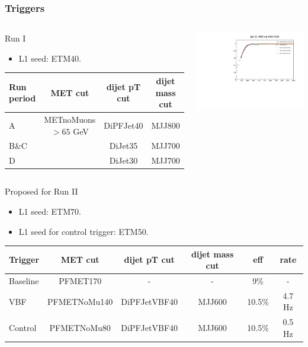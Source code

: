 \documentclass[red,compress,xcolor=table]{beamer}
\begin{document}
\begin{frame}
\begin{columns}
\end{columns}

\end{frame}

\begin{frame}
\frametitle{Triggers}

\begin{columns}
\begin{block}{\scriptsize Run I}
\begin{itemize}
\item \scriptsize L1 seed: ETM40.
\end{itemize}
{\tiny
\begin{tabular}{|l|c|c|c|}
\hline
Run period & MET cut & dijet pT cut & dijet mass cut \\
\hline
A & METnoMuons$>65$ GeV & DiPFJet40 & MJJ800 \\
B\&C &  & DiJet35 & MJJ700 \\
D &  & DiJet30 & MJJ700 \\
\hline
\end{tabular}
}
\end{block}
\includegraphics[width=1.0\textwidth]{./hData_MET_1D_45D.pdf}
\end{columns}

\begin{center}
\begin{block}{\scriptsize Proposed for Run II}
\begin{itemize}
\item \scriptsize L1 seed: ETM70.
\item \scriptsize L1 seed for control trigger: ETM50.
\end{itemize}
{\tiny
\begin{tabular}{|l|c|c|c|c|c|}
\hline
Trigger & MET cut & dijet pT cut & dijet mass cut & eff & rate \\
\hline
Baseline & PFMET170 & - & - & 9\% & - \\
VBF & PFMETNoMu140 &  DiPFJetVBF40 & MJJ600 & 10.5\% & 4.7 Hz \\
Control & PFMETNoMu80 &  DiPFJetVBF40 & MJJ600 & 10.5\% & 0.5 Hz \\
\hline
\end{tabular}
}
\end{block}
\end{center}


\end{frame}
\end{document}

